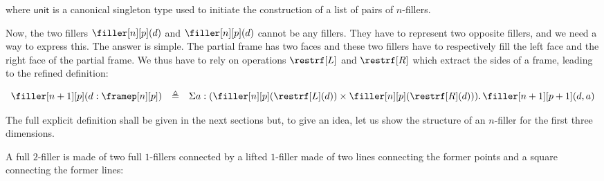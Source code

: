 \documentclass[10pt]{art.cls/art}
\newcommand{\unittype}{\ensuremath{\mathsf{unit}}}
\newcommand{\defeq}{\ensuremath{\triangleq}}
\begin{document}
where $\unittype$ is a canonical singleton type used to initiate the
construction of a list of pairs of $n$-fillers.

Now, the two fillers $\filler[n][p](d)$ and $\filler[n][p](d)$ cannot be any fillers. They have to represent two opposite fillers, and we need a way to express this. The answer is simple. The partial frame has two faces and these two fillers have to respectively fill the left face and the right face of the partial frame. We thus have to rely on operations $\restrf[L]$ and $\restrf[R]$ which extract the sides of a frame, leading to the refined definition:

\begin{equation*}
  \begin{array}{lll}
    \filler[n+1][p](d:\framep[n][p]) & \defeq & \Sigma a:(\filler[n][p](\restrf[L](d)) \times \filler[n][p](\restrf[R](d))) .\, \filler[n+1][p+1](d,a)
  \end{array}
\end{equation*}

The full explicit definition shall be given in the next sections but, to give an idea, let us show the structure of an $n$-filler for the first three dimensions.

A full $2$-filler is made of two full $1$-fillers connected by a lifted $1$-filler made of two lines connecting the former points and a square connecting the former lines:
\end{document}
